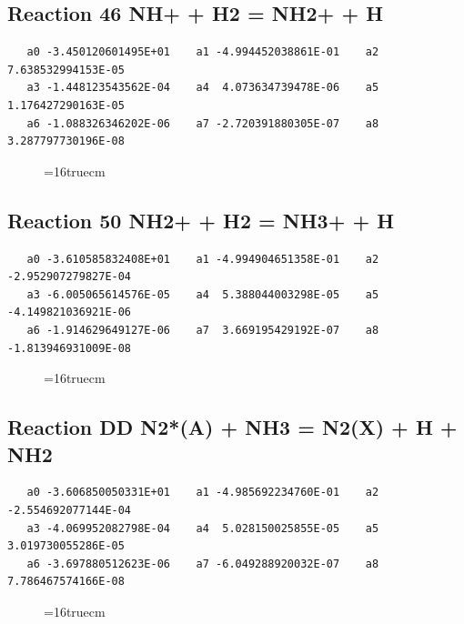 \documentclass[12pt,dvipdfm]{article}
\begin{document}
\subsection{
Reaction 46 NH+ + H2 = NH2+ + H}
\begin{small}\begin{verbatim}
   a0 -3.450120601495E+01    a1 -4.994452038861E-01    a2  7.638532994153E-05
   a3 -1.448123543562E-04    a4  4.073634739478E-06    a5  1.176427290163E-05
   a6 -1.088326346202E-06    a7 -2.720391880305E-07    a8  3.287797730196E-08
   \end{verbatim}\end{small}
\begin{figure}[h!] \label{n2rates}
\epsfxsize=16truecm
\end{figure}
\newpage

\subsection{
Reaction 50 NH2+ + H2 = NH3+ + H}
\begin{small}\begin{verbatim}
   a0 -3.610585832408E+01    a1 -4.994904651358E-01    a2 -2.952907279827E-04
   a3 -6.005065614576E-05    a4  5.388044003298E-05    a5 -4.149821036921E-06
   a6 -1.914629649127E-06    a7  3.669195429192E-07    a8 -1.813946931009E-08
   \end{verbatim}\end{small}
\begin{figure}[h!] \label{n2rates}
\epsfxsize=16truecm
\end{figure}
\newpage

\subsection{
Reaction DD N2*(A) + NH3 = N2(X) + H + NH2}
\begin{small}\begin{verbatim}
   a0 -3.606850050331E+01    a1 -4.985692234760E-01    a2 -2.554692077144E-04
   a3 -4.069952082798E-04    a4  5.028150025855E-05    a5  3.019730055286E-05
   a6 -3.697880512623E-06    a7 -6.049288920032E-07    a8  7.786467574166E-08
   \end{verbatim}\end{small}
\begin{figure}[h!] \label{n2rates}
\epsfxsize=16truecm
\end{figure}
\newpage
\end{document}
